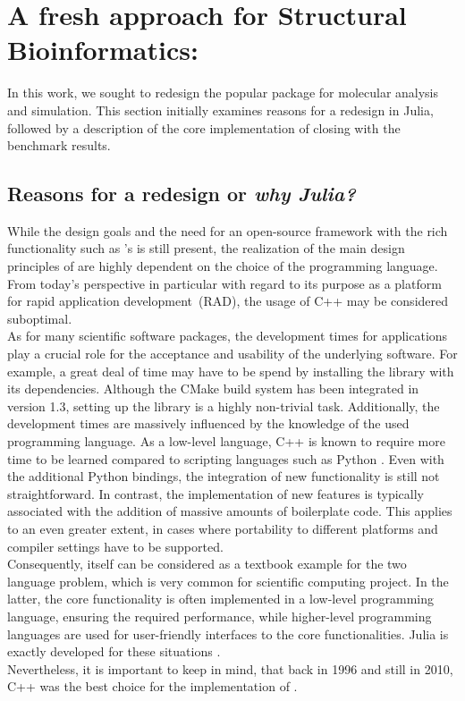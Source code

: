 
\section{A fresh approach for Structural Bioinformatics: \biochem}
\label{sec:juliaball}
In this work, we sought to redesign the popular \ball package for molecular analysis and simulation. This section initially examines reasons for a redesign in Julia, followed by a description of the core implementation of \biochem closing with the benchmark results. 

\subsection{Reasons for a redesign or \textit{why Julia?}}

While the design goals and the need for an open-source framework with the rich functionality such as \ball's  is still present, the realization of the main design principles of \ball are highly dependent on the choice of the programming language. From today's perspective in particular with regard to its purpose as a platform for rapid application development~(RAD), the usage of C++ may be considered suboptimal. \\
As for many scientific software packages, the development times for applications play a crucial role for the acceptance and usability of the underlying software. For example, a great deal of time may have to be spend by installing the library with its dependencies. Although the CMake build system has been integrated in version 1.3, setting up the library is a highly non-trivial task. Additionally, the development times are massively influenced by the knowledge of the used programming language. As a low-level language, C++ is known to require more time to be learned compared to scripting languages such as Python \cite{Ousterhout1998}. 
Even with the additional Python bindings, the integration of new functionality is still not straightforward. In contrast, the implementation of new features is typically associated with the addition of massive amounts of boilerplate code. This applies to an even greater extent, in cases where portability to different platforms and compiler settings have to be supported. \\
Consequently, \ball itself can be considered as a textbook example for the two language problem, which is very common for scientific computing project. In the latter, the core functionality is often implemented in a low-level programming language, ensuring the required performance, while higher-level programming languages are used for user-friendly interfaces to the core functionalities. Julia is exactly developed for these situations \cite{Julia_what, Julia_accomplish}.\\ Nevertheless, it is important to keep in mind, that back in 1996 and still in 2010, C++ was the best choice for the implementation of \ball. \\
